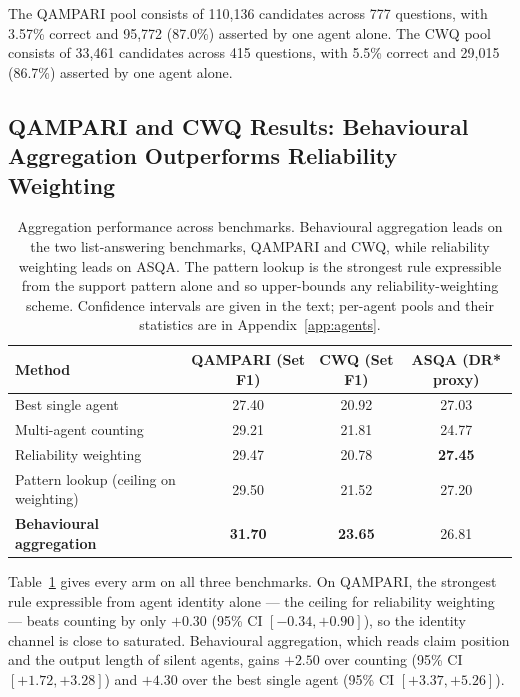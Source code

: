 \documentclass{article}
\begin{document}
The QAMPARI pool consists of 110,136 candidates across 777 questions, with 3.57\% correct and 95,772 (87.0\%) asserted by one agent alone. The CWQ pool consists of 33,461 candidates across 415 questions, with 5.5\% correct and 29,015 (86.7\%) asserted by one agent alone.

\subsection{QAMPARI and CWQ Results: Behavioural Aggregation Outperforms Reliability Weighting}
\label{sec:rq1}

\begin{table}[h]
\centering
\caption{Aggregation performance across benchmarks. Behavioural aggregation leads on the two list-answering benchmarks, QAMPARI and CWQ, while reliability weighting leads on ASQA. The pattern lookup is the strongest rule expressible from the support pattern alone and so upper-bounds any reliability-weighting scheme. Confidence intervals are given in the text; per-agent pools and their statistics are in Appendix~\ref{app:agents}.}
\label{tab:main}
\begin{tabular}{lccc}
\toprule
\textbf{Method} & \textbf{QAMPARI (Set F1)} & \textbf{CWQ (Set F1)} & \textbf{ASQA (DR* proxy)} \\
\midrule
Best single agent & 27.40 & 20.92 & 27.03 \\
Multi-agent counting & 29.21 & 21.81 & 24.77 \\
Reliability weighting & 29.47 & 20.78 & \textbf{27.45} \\
Pattern lookup (ceiling on weighting) & 29.50 & 21.52 & 27.20 \\
\textbf{Behavioural aggregation} & \textbf{31.70} & \textbf{23.65} & 26.81 \\
\bottomrule
\end{tabular}
\end{table}


Table~\ref{tab:main} gives every arm on all three benchmarks. On QAMPARI, the strongest rule expressible from agent identity alone --- the ceiling for reliability weighting --- beats counting by only $+0.30$ (95\% CI $[-0.34, +0.90]$), so the identity channel is close to saturated. Behavioural aggregation, which reads claim position and the output length of silent agents, gains $+2.50$ over counting (95\% CI $[+1.72, +3.28]$) and $+4.30$ over the best single agent (95\% CI $[+3.37, +5.26]$).
\end{document}
